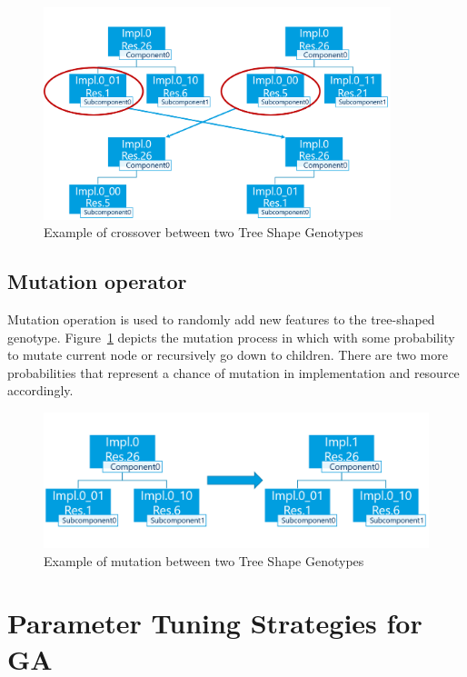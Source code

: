 \begin{figure}
	\centering
	\includegraphics[width=0.9\textwidth]{images/GeneticSolverCrossover.png}
	\caption[Crossover in Tree Shape Genotype]{Example of crossover between two Tree Shape Genotypes}
	\label{fig:GeneticSolverCrossover}
\end{figure}



\subsection{Mutation operator}

Mutation operation is used to randomly add new features to the tree-shaped genotype. Figure~\ref{fig:GeneticSolverCrossover} depicts the mutation process in which with some probability to mutate current node or recursively go down to children.
There are two more probabilities that represent a chance of mutation in implementation and resource accordingly. 

\begin{figure}
	\centering
	\includegraphics[width=\textwidth]{images/GeneticSolverMutation.png}
	\caption[Mutation in Tree Shape Genotype]{Example of mutation between two Tree Shape Genotypes}
	\label{fig:GeneticSolverMutation}
\end{figure}

\section{Parameter Tuning Strategies for GA}

